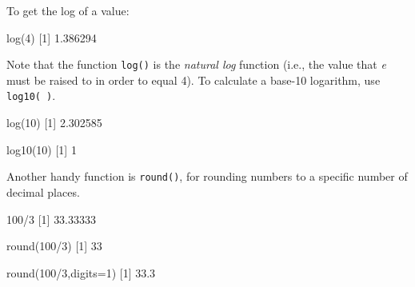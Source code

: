 \documentclass[
]{book}
\newenvironment{Shaded}{\begin{snugshade}}{\end{snugshade}}
\newcommand{\AttributeTok}[1]{\textcolor[rgb]{0.77,0.63,0.00}{#1}}
\newcommand{\DecValTok}[1]{\textcolor[rgb]{0.00,0.00,0.81}{#1}}
\newcommand{\FloatTok}[1]{\textcolor[rgb]{0.00,0.00,0.81}{#1}}
\newcommand{\FunctionTok}[1]{\textcolor[rgb]{0.00,0.00,0.00}{#1}}
\newcommand{\NormalTok}[1]{#1}
\newcommand{\SpecialCharTok}[1]{\textcolor[rgb]{0.00,0.00,0.00}{#1}}
\begin{document}
To get the log of a value:

\begin{Shaded}
\begin{Highlighting}[]
\FunctionTok{log}\NormalTok{(}\DecValTok{4}\NormalTok{)}
\NormalTok{[}\DecValTok{1}\NormalTok{] }\FloatTok{1.386294}
\end{Highlighting}
\end{Shaded}

Note that the function \texttt{log()} is the \emph{natural log} function (i.e., the value that \emph{e} must be raised to in order to equal 4). To calculate a base-10 logarithm, use \texttt{log10(\ )}.

\begin{Shaded}
\begin{Highlighting}[]
\FunctionTok{log}\NormalTok{(}\DecValTok{10}\NormalTok{)}
\NormalTok{[}\DecValTok{1}\NormalTok{] }\FloatTok{2.302585}
\end{Highlighting}
\end{Shaded}

\begin{Shaded}
\begin{Highlighting}[]
\FunctionTok{log10}\NormalTok{(}\DecValTok{10}\NormalTok{)}
\NormalTok{[}\DecValTok{1}\NormalTok{] }\DecValTok{1}
\end{Highlighting}
\end{Shaded}

Another handy function is \texttt{round()}, for rounding numbers to a specific number of decimal places.

\begin{Shaded}
\begin{Highlighting}[]
\DecValTok{100}\SpecialCharTok{/}\DecValTok{3}
\NormalTok{[}\DecValTok{1}\NormalTok{] }\FloatTok{33.33333}
\end{Highlighting}
\end{Shaded}

\begin{Shaded}
\begin{Highlighting}[]
\FunctionTok{round}\NormalTok{(}\DecValTok{100}\SpecialCharTok{/}\DecValTok{3}\NormalTok{)}
\NormalTok{[}\DecValTok{1}\NormalTok{] }\DecValTok{33}
\end{Highlighting}
\end{Shaded}

\begin{Shaded}
\begin{Highlighting}[]
\FunctionTok{round}\NormalTok{(}\DecValTok{100}\SpecialCharTok{/}\DecValTok{3}\NormalTok{,}\AttributeTok{digits=}\DecValTok{1}\NormalTok{)}
\NormalTok{[}\DecValTok{1}\NormalTok{] }\FloatTok{33.3}
\end{Highlighting}
\end{Shaded}
\end{document}
